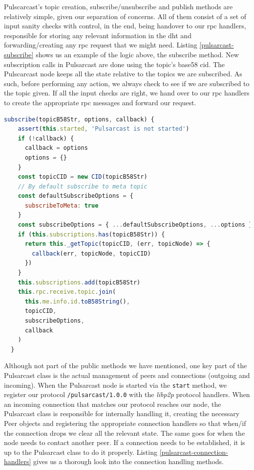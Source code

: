 Pulscarcast's topic creation, subscribe/unsubscribe and publish methods are
relatively simple, given our separation of concerns. All of them consist of a
set of input sanity checks with control, in the end, being handover to our
\acrshort{rpc} handlers, responsible for storing any relevant information in
the \acrshort{dht} and forwarding/creating any \acrshort{rpc} request that we
might need. Listing \ref{pulsarcast-subscribe} shows us an example of the logic
above, the subscribe method. New subscription calls in Pulsarcast are done
using the topic's base58 \acrshort{cid}. The Pulscarcast node keeps all the
state relative to the topics we are subscribed. As such, before performing any
action, we always check to see if we are subscribed to the topic given. If all
the input checks are right, we hand over to our \acrshort{rpc} handlers to
create the appropriate \acrshort{rpc} messages and forward our request.

\begin{lstlisting}[language=JavaScript, float, caption={Pulsarcast class subscribe method},label={pulsarcast-subscribe}]
  subscribe(topicB58Str, options, callback) {
    assert(this.started, 'Pulsarcast is not started')
    if (!callback) {
      callback = options
      options = {}
    }
    const topicCID = new CID(topicB58Str)
    // By default subscribe to meta topic
    const defaultSubscribeOptions = {
      subscribeToMeta: true
    }
    const subscribeOptions = { ...defaultSubscribeOptions, ...options }
    if (this.subscriptions.has(topicB58Str)) {
      return this._getTopic(topicCID, (err, topicNode) => {
        callback(err, topicNode, topicCID)
      })
    }
    this.subscriptions.add(topicB58Str)
    this.rpc.receive.topic.join(
      this.me.info.id.toB58String(),
      topicCID,
      subscribeOptions,
      callback
    )
  }
\end{lstlisting}

Although not part of the public methods we have mentioned, one key part of the
Pulsarcast class is the actual management of peers and connections (outgoing
and incoming). When the Pulsarcast node is started via the \verb|start| method,
we register our protocol \verb|/pulsarcast/1.0.0| with the \emph{libp2p}
protocol handlers. When an incoming connection that matches our protocol
reaches our node, the Pulsarcast class is responsible for internally handling
it, creating the necessary Peer objects and registering the appropriate
connection handlers so that when/if the connection drops we clear all the
relevant state. The same goes for when the node needs to contact another peer.
If a connection needs to be established, it is up to the Pulsarcast class to do
it properly. Listing \ref{pulsarcast-connection-handlers} gives us a thorough
look into the connection handling methods.

